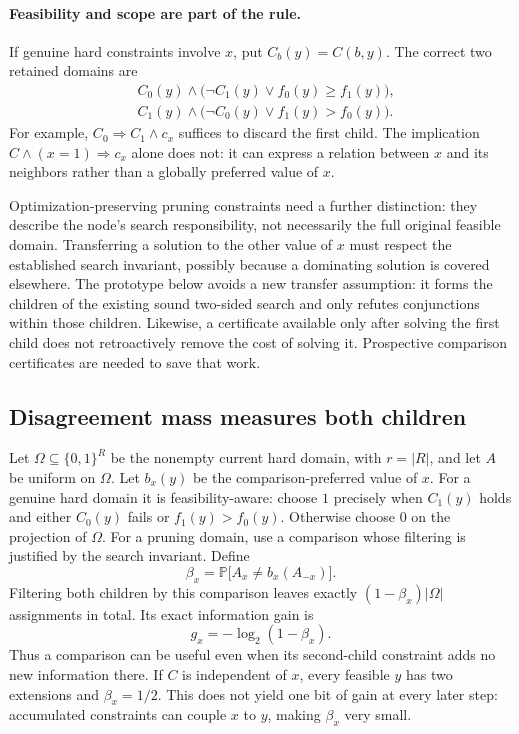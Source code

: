 \documentclass[11pt,a4paper]{article}
\theoremstyle{definition}
\theoremstyle{remark}
\newcommand{\Prb}{\mathbb P}
\begin{document}
\paragraph{Feasibility and scope are part of the rule.}
If genuine hard constraints involve $x$, put $C_b(y)=C(b,y)$.
The correct two retained domains are
\begin{align*}
 &C_0(y)\wedge\bigl(\neg C_1(y)\vee f_0(y)\ge f_1(y)\bigr),\\
 &C_1(y)\wedge\bigl(\neg C_0(y)\vee f_1(y)>f_0(y)\bigr).
\end{align*}
For example, $C_0\Rightarrow C_1\wedge c_x$ suffices to discard the first
child. The implication $C\wedge(x=1)\Rightarrow c_x$ alone does not:
it can express a relation between $x$ and its neighbors rather than
a globally preferred value of $x$.

Optimization-preserving pruning constraints need a further distinction:
they describe the node's search responsibility, not necessarily the full
original feasible domain. Transferring a solution to the other value of
$x$ must respect the established search invariant, possibly because a
dominating solution is covered elsewhere. The prototype below avoids a
new transfer assumption: it forms the children of the existing sound
two-sided search and only refutes conjunctions within those children.
Likewise, a certificate available only after solving the first child
does not retroactively remove the cost of solving it. Prospective
comparison certificates are needed to save that work.

\subsection{Disagreement mass measures both children}

Let $\Omega\subseteq\{0,1\}^R$ be the nonempty current hard domain,
with $r=|R|$, and let $A$ be uniform on $\Omega$.
Let $b_x(y)$ be the comparison-preferred value of $x$.
For a genuine hard domain it is feasibility-aware: choose $1$ precisely
when $C_1(y)$ holds and either $C_0(y)$ fails or $f_1(y)>f_0(y)$.
Otherwise choose $0$ on the projection of $\Omega$.
For a pruning domain, use a comparison whose filtering is justified by
the search invariant. Define
\[
 \beta_x=\Prb\bigl[A_x\ne b_x(A_{-x})\bigr].
\]
Filtering both children by this comparison leaves exactly
$(1-\beta_x)|\Omega|$ assignments in total. Its exact information gain is
\begin{equation}
 g_x=-\log_2(1-\beta_x).                         \label{eq:disagreement}
\end{equation}
Thus a comparison can be useful even when its second-child constraint
adds no new information there. If $C$ is independent of $x$, every
feasible $y$ has two extensions and $\beta_x=1/2$. This does not yield
one bit of gain at every later step: accumulated constraints can couple
$x$ to $y$, making $\beta_x$ very small.
\end{document}
